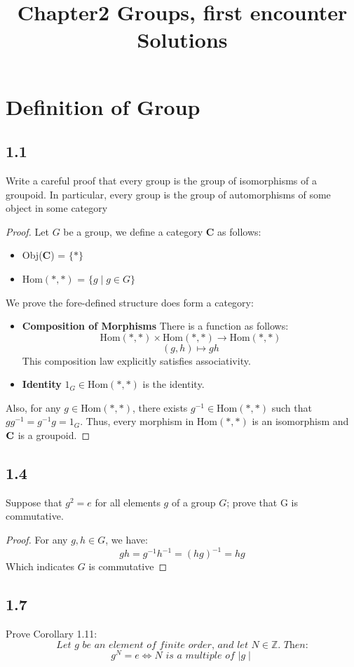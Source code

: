 \documentclass[a4paper, pdf, 12pt]{article}
\title{Chapter2 Groups, first encounter Solutions}
\newcommand{\catname}[1]{{\normalfont\textbf{#1}}}
\begin{document}
\section*{Definition of Group}
\subsection*{1.1} Write a careful proof that every group is the group of isomorphisms of a
groupoid. In particular, every group is the group of automorphisms of some object
in some category
\begin{proof}
  Let $G$ be a group, we define a category \catname{C} as follows:
  \begin{itemize}
    \item Obj(\catname{C}) = $\{*\}$
    \item Hom$(*,*)$ = $\{g \mid g \in G\}$
  \end{itemize}
  We prove the fore-defined structure does form a category:
  \begin{itemize}
    \item \textbf{Composition of Morphisms}\quad
          There is a function as follows:\\
          $$
            \mbox{Hom}(*,*) \times \mbox{Hom}(*,*) \rightarrow \mbox{Hom}(*,*)
          $$
          $$
            (g,h)\mapsto gh
          $$
          This composition law explicitly satisfies associativity.

    \item \textbf{Identity} $1_G\in \mbox{Hom}(*,*)$ is the identity.
  \end{itemize}
  Also, for any $g\in \mbox{Hom}(*,*)$, there exists $g^{-1}\in \mbox{Hom}(*,*)$ such that
  $gg^{-1} = g^{-1}g = 1_G$. Thus, every morphism in $\mbox{Hom}(*,*)$ is an isomorphism and
  $\catname{C}$ is a groupoid.
\end{proof}

\subsection*{1.4} Suppose that $g^2 = e$ for all elements $g$ of a group $G$; prove that G is commutative.
\begin{proof}
  For any $g,h\in G$, we have:
  $$
    gh = g^{-1}h^{-1} = (hg)^{-1} = hg
  $$
  Which indicates $G$ is commutative
\end{proof}

\subsection*{1.7} Prove Corollary 1.11: \\
$$
  \textit{Let $g$ be an element of finite order, and let $N\in\mathbb{Z}$. Then:}
$$
$$
  \textit{$g^{N}=e\Leftrightarrow N$ is a multiple of $\mid g\mid$}
$$
\end{document}
